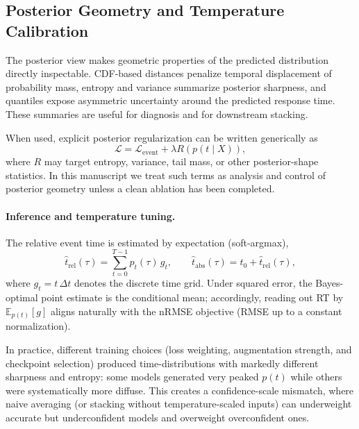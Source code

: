 \documentclass[12pt]{article}
\begin{document}
\subsection{Posterior Geometry and Temperature Calibration}

The posterior view makes geometric properties of the predicted distribution directly inspectable. CDF-based distances penalize temporal displacement of probability mass, entropy and variance summarize posterior sharpness, and quantiles expose asymmetric uncertainty around the predicted response time. These summaries are useful for diagnosis and for downstream stacking.

When used, explicit posterior regularization can be written generically as
\begin{equation}
\label{eq:posterior_regularized_objective}
\mathcal{L} = \mathcal{L}_{\mathrm{event}} + \lambda R\!\left(p(t\mid X)\right),
\end{equation}
where $R$ may target entropy, variance, tail mass, or other posterior-shape statistics. In this manuscript we treat such terms as analysis and control of posterior geometry unless a clean ablation has been completed.

\paragraph{Inference and temperature tuning.}
The relative event time is estimated by expectation (soft-argmax),
\begin{equation}
\label{eq:rt_soft_argmax}
\hat t_{\mathrm{rel}}(\tau)=\sum_{t=0}^{T-1} p_t(\tau)\, g_t,
\qquad
\hat t_{\mathrm{abs}}(\tau)=t_0+\hat t_{\mathrm{rel}}(\tau),
\end{equation}
where $g_t=t\,\Delta t$ denotes the discrete time grid. Under squared error, the Bayes-optimal point estimate is the
conditional mean; accordingly, reading out RT by $\mathbb{E}_{p(t)}[g]$ aligns naturally with the nRMSE objective (RMSE
up to a constant normalization).

In practice, different training choices (loss weighting, augmentation strength, and checkpoint selection) produced
time-distributions with markedly different sharpness and entropy: some models generated very peaked $p(t)$ while others
were systematically more diffuse. This creates a confidence-scale mismatch, where naive averaging (or stacking without
temperature-scaled inputs) can underweight accurate but underconfident models and overweight overconfident ones.
\end{document}
